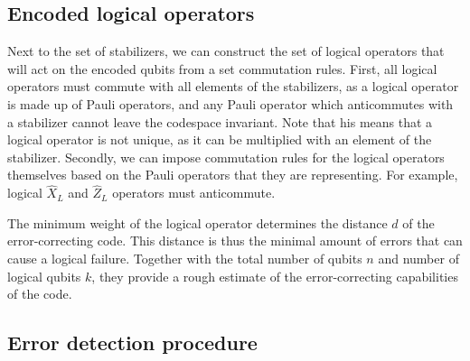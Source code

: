 \subsection{Encoded logical operators}

Next to the set of stabilizers, we can construct the set of logical operators that will act on the encoded qubits from a set commutation rules. First, all logical operators must commute with all elements of the stabilizers, as a logical operator is made up of Pauli operators, and any Pauli operator which anticommutes with a stabilizer cannot leave the codespace invariant. Note that his means that a logical operator is not unique, as it can be multiplied with an element of the stabilizer. Secondly, we can impose commutation rules for the logical operators themselves based on the Pauli operators that they are representing. For example, logical $\hat{X}_L$ and $\hat{Z}_L$ operators must anticommute.

The minimum weight of the logical operator determines the distance $d$ of the error-correcting code. This distance is thus the minimal amount of errors that can cause a logical failure. Together with the total number of qubits $n$ and number of logical qubits $k$, they provide a rough estimate of the error-correcting capabilities of the code.

\subsection{Error detection procedure}

